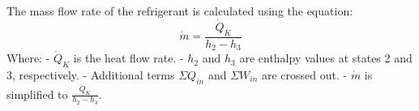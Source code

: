The mass flow rate of the refrigerant is calculated using the equation:  
\[ \dot{m} = \frac{\dot{Q}_K}{h_2 - h_3} \]  
Where:  
- \( \dot{Q}_K \) is the heat flow rate.  
- \( h_2 \) and \( h_3 \) are enthalpy values at states 2 and 3, respectively.  
- Additional terms \( \Sigma Q_{in} \) and \( \Sigma W_{in} \) are crossed out.  
- \( \dot{m} \) is simplified to \( \frac{\dot{Q}_K}{h_2 - h_3} \).